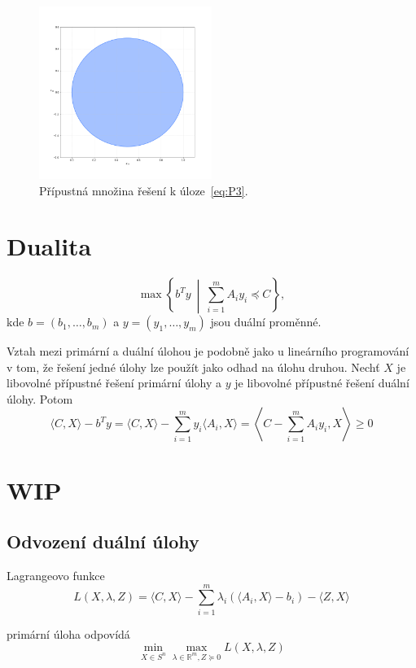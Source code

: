 \begin{figure}[h!]
    \centering
    \includegraphics[width=0.5\textwidth]{img/ex3.png}   
    \caption{Přípustná množina řešení k úloze~\ref{eq:P3}.}
    \label{fig:ex3}
\end{figure}

\section{Dualita}

$$
    \max \left\{ b^Ty \ \middle|\ \sum_{i=1}^m A_i y_i \preceq C \right\},
$$
kde $b = (b_1, \dots, b_m)$ a $y = (y_1, \dots, y_m)$ jsou duální proměnné.

Vztah mezi primární a duální úlohou je podobně jako u lineárního programování v tom, že řešení jedné úlohy lze použít jako odhad na úlohu druhou. Nechť $X$ je libovolné přípustné řešení primární úlohy a $y$ je libovolné přípustné řešení duální úlohy. Potom
$$
    \langle C, X \rangle - b^T y =
    \langle C, X \rangle - \sum_{i=1}^m y_i \langle A_i, X \rangle =
    \left\langle C - \sum_{i=1}^m A_i y_i, X \right\rangle \geq 0
$$


\section*{WIP}
\subsection*{Odvození duální úlohy}

\noindent Lagrangeovo funkce
$$
    L(X, \lambda, Z) = \langle C, X \rangle - \sum_{i=1}^m \lambda_i \left( \langle A_i, X \rangle - b_i \right) - \langle Z, X \rangle
$$

\noindent primární úloha odpovídá
$$
    \min_{X \in S^n} \max_{\lambda \in \mathbb{R}^m, Z \succeq 0} L(X, \lambda, Z)
$$

